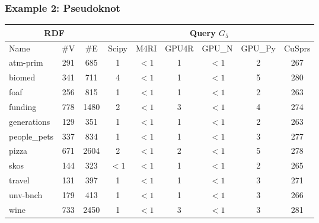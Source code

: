 \documentclass[xcolor=table]{beamer}
\newcommand{\ltz}{$< 1$}
\begin{document}
\begin{frame}[fragile] \frametitle{Example 2: Pseudoknot}
\begin{center}
  {\tiny
  \begin{tabular}{| p{1.25cm} | c | c | c | c | c | c | c | c | }
      \hline
      \multicolumn{3}{|c|}{RDF}        & \multicolumn{6}{|c|}{Query $G_5$}                              \\
      \hline
      Name                                & \#V & \#E  & Scipy & M4RI  & GPU4R & GPU\_N & GPU\_Py & CuSprs \\
      \hline
      \hline
      \tiny{atm-prim}                    & 291 & 685   & 1     & \ltz & 1     & \ltz   & 2       & 267  \\
      \tiny{biomed}                      & 341 & 711   & 4     & \ltz & 1     & \ltz   & 5       & 280  \\
      \tiny{foaf}                        & 256 & 815   & 1     & \ltz & 1     & \ltz   & 2       & 263  \\
      \tiny{funding}                     & 778 & 1480  & 2     & \ltz & 3     & \ltz   & 4       & 274  \\
      \tiny{generations}                 & 129 & 351   & 1     & \ltz & 1     & \ltz   & 2       & 263  \\
      \tiny{people\_pets}                & 337 & 834   & 1     & \ltz & 1     & \ltz   & 3       & 277  \\
      \tiny{pizza}                       & 671 & 2604  & 2     & \ltz & 2     & \ltz   & 5       & 278  \\
      \tiny{skos}                        & 144 & 323   & \ltz  & \ltz & 1     & \ltz   & 2       & 265  \\
      \tiny{travel}                      & 131 & 397   & 1     & \ltz & 1     & \ltz   & 3       & 271  \\
      \tiny{unv-bnch}                    & 179 & 413   & 1     & \ltz & 1     & \ltz   & 3       & 266  \\
      \tiny{wine}                        & 733 & 2450  & 1     & \ltz & 3     & \ltz   & 3       & 281  \\
      \hline
    \end{tabular}
    }
    \end{center}
\end{frame}
\end{document}
